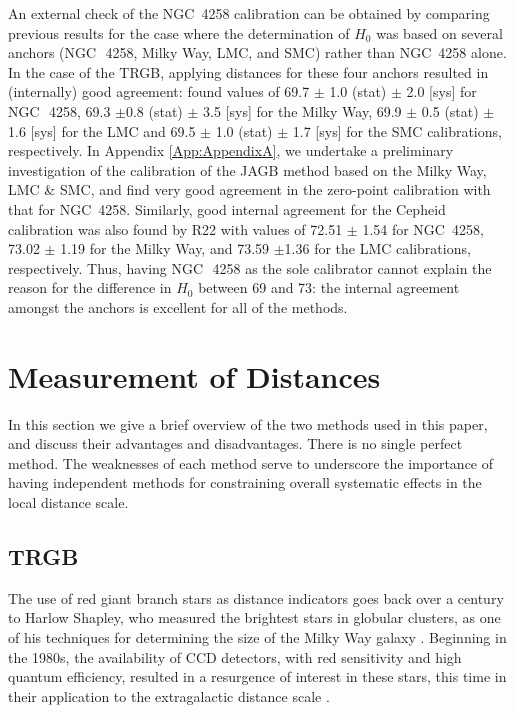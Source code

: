 \documentclass[12pt,modern]{aastex631}
\newcommand{\ho}{$H_{0}$\xspace}
\newcommand{\ngc}{NGC\,\xspace}
\begin{document}
 
An external check of  the \ngc4258 calibration can be obtained by comparing previous results for the case where the determination of \ho was based on several anchors (\ngc~4258, Milky Way, LMC, and SMC) rather than \ngc 4258 alone. In the case of the TRGB,  applying distances for these four anchors resulted in (internally) good agreement:  \citet{freedman_2021} found values of 69.7 $\pm$ 1.0 (stat) $\pm$ 2.0 [sys] for \ngc~4258, 69.3 $\pm$0.8 (stat) $\pm$ 3.5 [sys] for the Milky Way,  69.9 $\pm$ 0.5 (stat) $\pm$ 1.6 [sys] for the LMC and  69.5 $\pm$ 1.0 (stat) $\pm$ 1.7 [sys] for the SMC calibrations, respectively. In Appendix \ref{App:AppendixA}, we undertake a preliminary investigation of the calibration of the JAGB method based on the Milky Way, LMC \& SMC, and find very good agreement in the zero-point calibration with that for \ngc 4258.
Similarly, good internal agreement for the Cepheid calibration was also found by R22 with  values of 72.51 $\pm$ 1.54 for \ngc 4258, 73.02 $\pm$ 1.19 for the Milky Way, and 73.59 $\pm$1.36 for the LMC calibrations, respectively. Thus,  having \ngc~4258 as the sole calibrator cannot explain the reason for the  difference in \ho between 69 and 73: the internal agreement amongst the anchors is excellent for  all of the methods. 

\medskip\medskip\medskip\medskip\medskip\medskip\medskip\medskip

\section{Measurement of Distances}
\label{sec:distances}

In this section we give a brief overview of the two methods used in this paper, and discuss their advantages and disadvantages. There is no single perfect method. The weaknesses of each method serve to underscore the importance of having independent methods for constraining overall systematic effects in the local distance scale. 


\subsection{TRGB}
\label{sec:trgb}

The use of red giant branch stars as distance indicators goes back over a century to Harlow Shapley, who measured the brightest stars in globular clusters, as one of his techniques for determining the size of the Milky Way galaxy \citep{shapley_1918}. Beginning in the 1980s, the availability of CCD detectors, with red sensitivity and high quantum efficiency, resulted in a resurgence of interest in these stars, this time in their application to the extragalactic distance scale \citep{mould_kristian_1986, da_costa_armandroff_1990, lee_1993}. 
\end{document}
